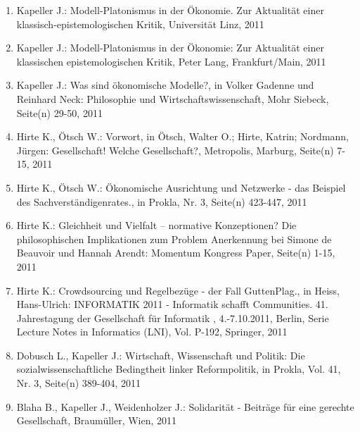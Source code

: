 \begin{enumerate}
	 \item Kapeller J.: Modell-Platonismus in der Ökonomie. Zur Aktualität einer klassisch-epistemologischen Kritik, Universität Linz, 2011
	 \item Kapeller J.: Modell-Platonismus in der Ökonomie: Zur Aktualität einer klassischen epistemologischen Kritik, Peter Lang, Frankfurt/Main, 2011
	 \item Kapeller J.: Was sind ökonomische Modelle?, in Volker Gadenne und Reinhard Neck: Philosophie und Wirtschaftswissenschaft, Mohr Siebeck, Seite(n) 29-50, 2011
	 \item Hirte K., Ötsch W.: Vorwort, in Ötsch, Walter O.; Hirte, Katrin; Nordmann, Jürgen: Gesellschaft! Welche Gesellschaft?, Metropolis, Marburg, Seite(n) 7-15, 2011
	 \item Hirte K., Ötsch W.: Ökonomische Ausrichtung und Netzwerke - das Beispiel des Sachverständigenrates., in Prokla, Nr. 3, Seite(n) 423-447, 2011
	 \item Hirte K.: Gleichheit und Vielfalt – normative Konzeptionen? Die philosophischen Implikationen zum Problem Anerkennung bei Simone de Beauvoir und Hannah Arendt: Momentum Kongress Paper, Seite(n) 1-15, 2011
	 \item Hirte K.: Crowdsourcing und Regelbezüge - der Fall GuttenPlag., in Heiss, Hans-Ulrich: INFORMATIK 2011 - Informatik schafft Communities. 41. Jahrestagung der Gesellschaft für Informatik , 4.-7.10.2011, Berlin, Serie Lecture Notes in Informatics (LNI), Vol. P-192, Springer, 2011
	 \item Dobusch L., Kapeller J.: Wirtschaft, Wissenschaft und Politik: Die sozialwissenschaftliche Bedingtheit linker Reformpolitik, in Prokla, Vol. 41, Nr. 3, Seite(n) 389-404, 2011
	 \item Blaha B., Kapeller J., Weidenholzer J.: Solidarität - Beiträge für eine gerechte Gesellschaft, Braumüller, Wien, 2011
\end{enumerate}

